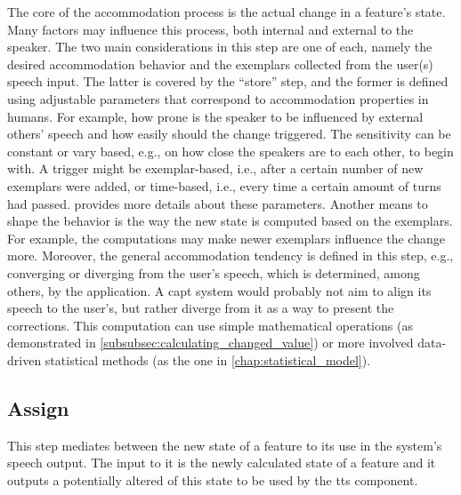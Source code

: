 The core of the accommodation process is the actual change in a feature's state.
Many factors may influence this process, both internal and external to the speaker.
The two main considerations in this step are one of each, namely the desired accommodation behavior and the exemplars collected from the user(s) speech input.
The latter is covered by the \enquote{store} step, and the former is defined using adjustable parameters that correspond to accommodation properties in humans.
For example, how prone is the speaker to be influenced by external others' speech and how easily should the change triggered.
The sensitivity can be constant or vary based, e.g., on how close the speakers are to each other, to begin with.
A trigger might be exemplar-based, i.e., after a certain number of new exemplars were added, or time-based, i.e., every time a certain amount of turns had passed.
 provides more details about these parameters.
Another means to shape the behavior is the way the new state is computed based on the exemplars.
For example, the computations may make newer exemplars influence the change more.
Moreover, the general accommodation tendency is defined in this step, e.g., converging or diverging from the user's speech, which is determined, among others, by the application.
A \ac{capt} system would probably not aim to align its speech to the user's, but rather diverge from it as a way to present the corrections.
This computation can use simple mathematical operations (as demonstrated in \cref{subsubsec:calculating_changed_value}) or more involved data-driven statistical methods (as the one in \cref{chap:statistical_model}).

\subsection{Assign}
\label{subsec:assign}

This step mediates between the new state of a feature to its use in the system's speech output.
The input to it is the newly calculated state of a feature and it outputs a potentially altered of this state to be used by the \ac{tts} component.

